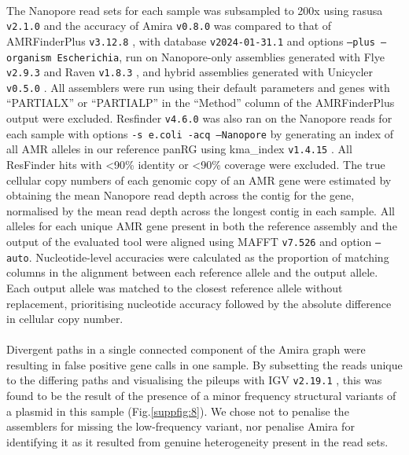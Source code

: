 \paragraph{}
The Nanopore read sets for each sample was subsampled to 200x using rasusa \texttt{v2.1.0} \cite{Hall2022} and the accuracy of Amira \texttt{v0.8.0} was compared to that of AMRFinderPlus \texttt{v3.12.8} \cite{Feldgarden2021}, with database \texttt{v2024-01-31.1} and options \texttt{--plus --organism Escherichia}, run on Nanopore-only assemblies generated with Flye \texttt{v2.9.3} \cite{Kolmogorov2019} and Raven \texttt{v1.8.3} \cite{10.1038/s43588-021-00073-4}, and hybrid assemblies generated with Unicycler \texttt{v0.5.0} \cite{Wick2017}. All assemblers were run using their default parameters and genes with “PARTIALX” or “PARTIALP” in the “Method” column of the AMRFinderPlus output were excluded. Resfinder \cite{Bortolaia2020} \texttt{v4.6.0} was also ran on the Nanopore reads for each sample with options \texttt{-s e.coli -acq --Nanopore} by generating an index of all AMR alleles in our reference panRG using kma\_index \texttt{v1.4.15} \cite{Clausen2018}. All ResFinder hits with <90\% identity or <90\% coverage were excluded. The true cellular copy numbers of each genomic copy of an AMR gene were estimated by obtaining the mean Nanopore read depth across the contig for the gene, normalised by the mean read depth across the longest contig in each sample. All alleles for each unique AMR gene present in both the reference assembly and the output of the evaluated tool were aligned using MAFFT \texttt{v7.526} \cite{mafft} and option \texttt{–auto}. Nucleotide-level accuracies were calculated as the proportion of matching columns in the alignment between each reference allele and the output allele. Each output allele was matched to the closest reference allele without replacement, prioritising nucleotide accuracy followed by the absolute difference in cellular copy number. 
\paragraph{}
Divergent paths in a single connected component of the Amira graph were resulting in false positive gene calls in one sample. By subsetting the reads unique to the differing paths and visualising the pileups with IGV \texttt{v2.19.1} \cite{10.1093/bib/bbs017}, this was found to be the result of the presence of a minor frequency structural variants of a plasmid in this sample (Fig.\ref{suppfig:8}). We chose not to penalise the assemblers for missing the low-frequency variant, nor penalise Amira for identifying it as it resulted from genuine heterogeneity present in the read sets.

